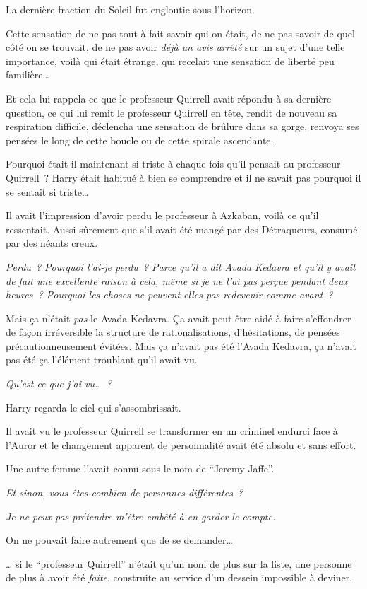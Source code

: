La dernière fraction du Soleil fut engloutie sous l'horizon.

Cette sensation de ne pas tout à fait savoir qui on était, de ne pas savoir de quel côté on se trouvait, de ne pas avoir \emph{déjà un avis arrêté} sur un sujet d'une telle importance, voilà qui était étrange, qui recelait une sensation de liberté peu familière…

Et cela lui rappela ce que le professeur Quirrell avait répondu à sa dernière question, ce qui lui remit le professeur Quirrell en tête, rendit de nouveau sa respiration difficile, déclencha une sensation de brûlure dans sa gorge, renvoya ses pensées le long de cette boucle ou de cette spirale ascendante.

Pourquoi était-il maintenant si triste à chaque fois qu'il pensait au professeur Quirrell~? Harry était habitué à bien se comprendre et il ne savait pas pourquoi il se sentait si triste…

Il avait l'impression d'avoir perdu le professeur à Azkaban, voilà ce qu'il ressentait. Aussi sûrement que s'il avait été mangé par des Détraqueurs, consumé par des néants creux.

\emph{Perdu~? Pourquoi l'ai-je perdu~? Parce qu'il a dit Avada Kedavra et qu'il y avait de fait une excellente raison à cela, même si je ne l'ai pas perçue pendant deux heures~? Pourquoi les choses ne peuvent-elles pas redevenir comme avant~?}

Mais ça n'était \emph{pas} le Avada Kedavra. Ça avait peut-être aidé à faire s'effondrer de façon irréversible la structure de rationalisations, d'hésitations, de pensées précautionneusement évitées. Mais ça n'avait pas été l'Avada Kedavra, ça n'avait pas été ça l'élément troublant qu'il avait vu.

\emph{Qu'est-ce que j'ai vu…~?}

Harry regarda le ciel qui s'assombrissait.

Il avait vu le professeur Quirrell se transformer en un criminel endurci face à l'Auror et le changement apparent de personnalité avait été absolu et sans effort.

Une autre femme l'avait connu sous le nom de “Jeremy Jaffe”.

\emph{Et sinon, vous êtes combien de personnes différentes~?}

\emph{Je ne peux pas prétendre m'être embêté à en garder le compte.}

On ne pouvait faire autrement que de se demander…

… si le “professeur Quirrell” n'était qu'un nom de plus sur la liste, une personne de plus à avoir été \emph{faite}, construite au service d'un dessein impossible à deviner.

